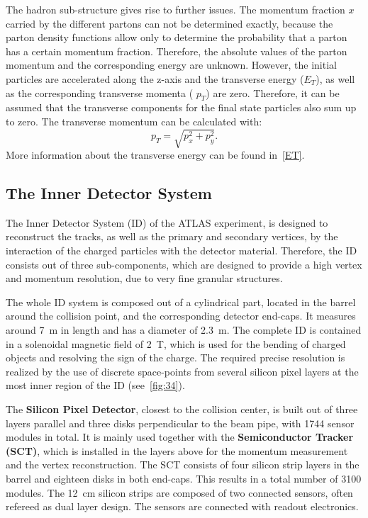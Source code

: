 The hadron sub-structure gives rise to further issues. The momentum fraction $x$ carried by the different partons can not be determined exactly, because the parton density functions allow only to determine the probability that a parton has a certain momentum fraction. Therefore, the absolute values of the parton momentum and the corresponding energy are unknown. 
However, the initial particles are accelerated along the z-axis and the transverse energy ($E_T$), as well as the corresponding transverse momenta ( $p_T$) are zero.
Therefore, it can be  assumed that the transverse components for the final state particles also sum up to zero.  The transverse momentum can be calculated with: 
 \begin{equation}
 p_T = \sqrt{p_x^2+p_y^2}.
 \end{equation}  
 More information about the transverse energy can be found in~\cref{ET}.        





\subsection{The Inner Detector System}\label{ID}
The Inner Detector System (ID) of the ATLAS experiment, is designed to reconstruct the tracks, as well as the primary and secondary vertices, by the interaction of the charged particles with the detector material. Therefore, the ID consists out of three sub-components, which are designed to provide a high vertex and momentum resolution, due to  very fine granular structures.

The whole ID system is composed out of a cylindrical part, located in the barrel around the collision point, and the corresponding detector end-caps. It measures around 7~m in length and has a diameter of 2.3~m. The complete ID is contained in a solenoidal magnetic field of 2~T, which is used for the bending of charged objects and resolving the sign of the charge. The required precise resolution is realized by the use of discrete space-points from several silicon pixel layers at the most inner region of the ID (see~\cref{fig:34}).

 The \textbf{Silicon Pixel Detector}, closest to the collision center, is built out of three layers parallel and three disks perpendicular to the beam pipe, with 1744 sensor modules in total. It is mainly used together with the \textbf{Semiconductor Tracker (SCT)}, which is installed in the layers above for the momentum measurement and the vertex reconstruction. The SCT consists of four silicon strip layers in the barrel and  eighteen disks in both end-caps. This results in a total number of 3100 modules. The 12~cm silicon strips are composed of two connected sensors, often refereed as dual layer design. The sensors are connected with readout electronics.

